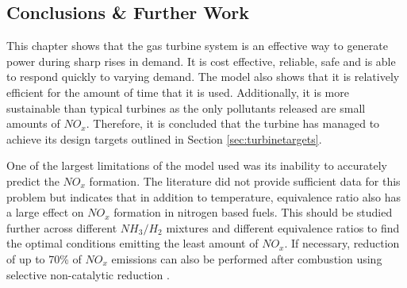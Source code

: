 \subsection{Conclusions \& Further Work}
This chapter shows that the gas turbine system is an effective way to generate power during sharp rises in demand. It is cost effective, reliable, safe and is able to respond quickly to varying demand. The model also shows that it is relatively efficient for the amount of time that it is used. Additionally, it is more sustainable than typical turbines as the only pollutants released are small amounts of $NO_x$. Therefore, it is concluded that the turbine has managed to achieve its design targets outlined in Section \ref{sec:turbinetargets}.

One of the largest limitations of the model used was its inability to accurately predict the $NO_x$ formation. The literature did not provide sufficient data for this problem but indicates that in addition to temperature, equivalence ratio also has a large effect on $NO_x$ formation in nitrogen based fuels. This should be studied further across different $NH_3/H_2$ mixtures and different equivalence ratios to find the optimal conditions emitting the least amount of $NO_x$. If necessary, reduction of up to 70\% of $NO_x$ emissions can also be performed after combustion using selective non-catalytic reduction \cite{NOxeffect}. %




%